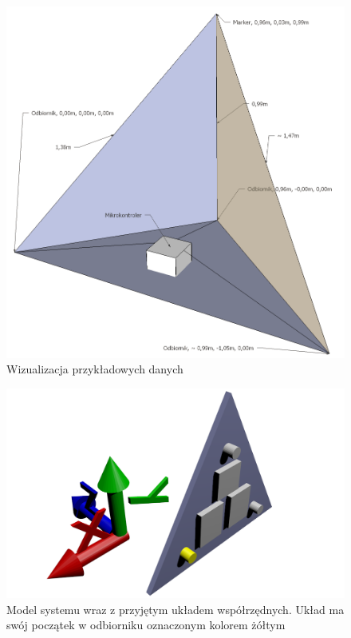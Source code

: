 \begin{figure}
  \includegraphics[width=\textwidth]{gfx/wizualizacja_3d_4_transparent.png}
  \caption{Wizualizacja przykładowych danych}
  \label{fig:trilateration_sample}
\end{figure}


\begin{figure}
 \includegraphics[width=\textwidth]{gfx/uklad_render.png}
 \caption[Model systemu i przyjęty układ współrzędnych]{Model systemu wraz z przyjętym układem współrzędnych. Układ ma swój początek w odbiorniku oznaczonym kolorem żółtym}
 \label{fig:coordinate_system}
\end{figure}

